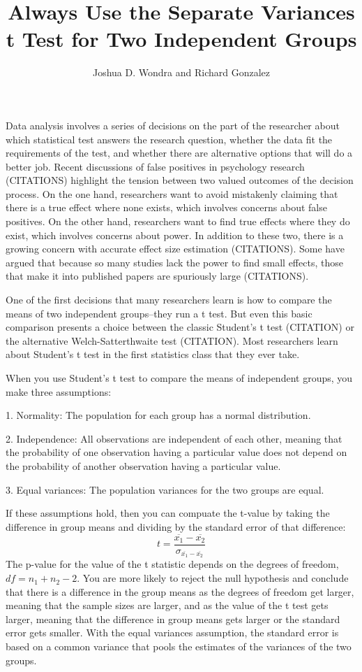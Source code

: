 \documentclass[man,a4paper,noextraspace]{apa6}\usepackage[]{graphicx}\usepackage[]{color}
\title{Always Use the Separate Variances t Test for Two Independent Groups}
\author{Joshua D. Wondra and Richard Gonzalez}
\affiliation{University of Michigan}
\begin{document}
\maketitle

    Data analysis involves a series of decisions on the part of the researcher about which statistical test answers the research question, whether the data fit the requirements of the test, and whether there are alternative options that will do a better job. Recent discussions of false positives in psychology research (CITATIONS) highlight the tension between two valued outcomes of the decision process. On the one hand, researchers want to avoid mistakenly claiming that there is a true effect where none exists, which involves concerns about false positives. On the other hand, researchers want to find true effects where they do exist, which involves concerns about power. In addition to these two, there is a growing concern with accurate effect size estimation (CITATIONS). Some have argued that because so many studies lack the power to find small effects, those that make it into published papers are spuriously large (CITATIONS).

    One of the first decisions that many researchers learn is how to compare the means of two independent groups--they run a t test. But even this basic comparison presents a choice between the classic Student's t test (CITATION) or the alternative Welch-Satterthwaite test (CITATION). Most researchers learn about Student's t test in the first statistics class that they ever take.  
    
When you use Student's t test to compare the means of independent groups, you make three assumptions: 
    
    1. Normality: The population for each group has a normal distribution.

    2. Independence: All observations are independent of each other, meaning that the probability of one observation having a particular value does not depend on the probability of another observation having a particular value.

    3. Equal variances: The population variances for the two groups are equal. 

If these assumptions hold, then you can compuate the t-value by taking the difference in group means and dividing by the standard error of that difference:   
    \begin{equation}
    t = \frac{\overline{x_1}-\overline{x_2}}{\sigma_{\overline{x_1}-\overline{x_2}}}
    \end{equation}
    The p-value for the value of the t statistic depends on the degrees of freedom, $df=n_1+n_2-2$. You are more likely to reject the null hypothesis and conclude that there is a difference in the group means as the degrees of freedom get larger, meaning that the sample sizes are larger, and as the value of the t test gets larger, meaning that the difference in group means gets larger or the standard error gets smaller. With the equal variances assumption, the standard error is based on a common variance that pools the estimates of the variances of the two groups. 
\end{document}
